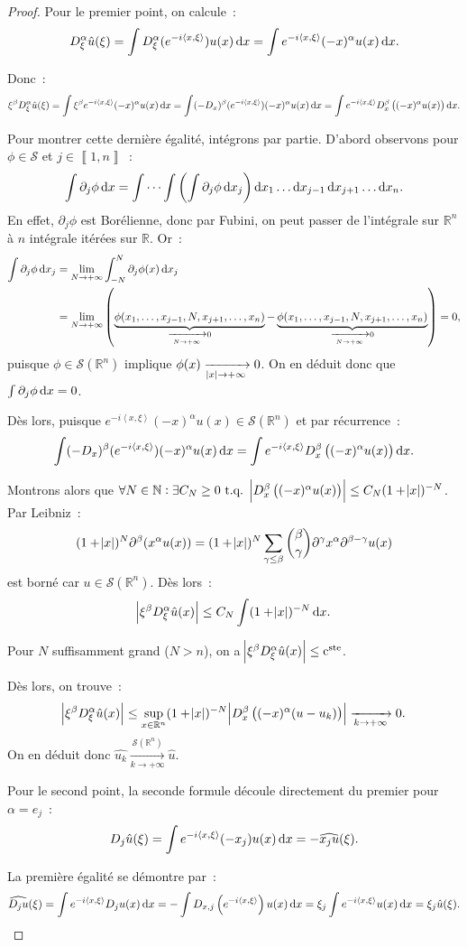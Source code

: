\documentclass{report}
\newcommand{\R}{{\mathbb R}}
\newcommand{\N}{{\mathbb N}}
\newcommand{\scpr}[2]{\left\langle#1, #2\right\rangle}
\newcommand{\tq}{\text{ t.q. }}
\newcommand{\pinfty}{{+\infty}}
\newcommand{\intint}[2]{{\left\llbracket#1, #2\right\rrbracket}}
\newcommand{\cste}{\text{c}^{\text{ste}}}
\newcommand{\dx}{\dif x}
\theoremstyle{definition}
\theoremstyle{remark}
\begin{document}
\begin{proof} Pour le premier point, on calcule~:
\[D^\alpha_\xi\hat u(\xi) = \int D^\alpha_\xi(e^{-i\scpr x\xi})u(x)\dif x = \int e^{-i\scpr x\xi}(-x)^\alpha u(x)\dif x.\]

Donc~:
\[\xi^\beta D^\alpha_\xi\hat u(\xi) = \int \xi^\beta e^{-i\scpr x\xi}(-x)^\alpha u(x)\dif x = \int (-D_x)^\beta(e^{-i\scpr x\xi})(-x)^\alpha u(x)\dif x
	= \int e^{-i\scpr x\xi} D^\beta_x\left((-x)^\alpha u(x)\right)\dif x.\]

Pour montrer cette dernière égalité, intégrons par partie. D'abord observons pour $\phi \in \mathcal S$ et $j \in \intint 1n$~:
\[\int \partial_j\phi\dx = \idotsint\left(\int \partial_j\phi\dx_j\right)\dx_1\ldots\dx_{j-1}\dx_{j+1}\ldots\dx_n.\]
En effet, $\partial_j\phi$ est Borélienne, donc par Fubini, on peut passer de l'intégrale sur $\R^n$ à $n$ intégrale itérées sur $\R$. Or~:
\begin{align*}
	\int \partial_j\phi\dx_j &= \lim_{N \to \pinfty}\int_{-N}^N\partial_j\phi(x)\dx_j \\
	&= \lim_{N \to \pinfty}\left(\underbrace {\phi(x_1, \ldots, x_{j-1}, N, x_{j+1}, \ldots, x_n)}_{\xrightarrow[N \to \pinfty]{} 0}
			- \underbrace {\phi(x_1, \ldots, x_{j-1}, N, x_{j+1}, \ldots, x_n)}_{\xrightarrow[N \to \pinfty]{} 0}\right) = 0,
\end{align*}
puisque $\phi \in \mathcal S(\R^n)$ implique $\phi(x) \xrightarrow[\abs x \to \pinfty]{} 0$. On en déduit donc que $\int\partial_j\phi\dx = 0$.

Dès lors, puisque $e^{-i\scpr x\xi}(-x)^\alpha u(x) \in \mathcal S(\R^n)$ et par récurrence~:
\[\int (-D_x)^\beta(e^{-i\scpr x\xi})(-x)^\alpha u(x)\dif x	= \int e^{-i\scpr x\xi} D^\beta_x\left((-x)^\alpha u(x)\right)\dif x.\]

Montrons alors que $\forall N \in \N : \exists C_N \geq 0 \tq \abs {D_x^\beta\left((-x)^\alpha u(x)\right)} \leq C_N(1 + \abs x)^{-N}$. Par Leibniz~:
\[(1 + \abs x)^N\partial^\beta (x^\alpha u(x)) = (1 + \abs x)^N\sum_{\gamma \leq \beta} \binom \beta\gamma\partial^\gamma x^\alpha\partial^{\beta-\gamma}u(x)\]
est borné car $u \in \mathcal S(\R^n)$. Dès lors~:
\[\abs {\xi^\beta D_\xi^\alpha \hat u(x)} \leq C_N\int(1 + \abs x)^{-N}\dx.\]

Pour $N$ suffisamment grand ($N > n$), on a $\abs {\xi^\beta D_\xi^\alpha \hat u(x)} \leq \cste$.

Dès lors, on trouve~:
\[\abs {\xi^\beta D_\xi^\alpha\hat u(x)} \leq \sup_{x \in \R^n}(1 + \abs x)^{-N}\abs {D_x^\beta\left((-x)^\alpha(u - u_k)\right)} \xrightarrow[k \to \pinfty]{} 0.\]
On en déduit donc $\hat {u_k} \xrightarrow[k \to \pinfty]{\mathcal S(\R^n)} \hat u$.

Pour le second point, la seconde formule découle directement du premier pour $\alpha = e_j$~:
\[D_j\hat u(\xi) = \int e^{-i\scpr x\xi}(-x_j)u(x)\dx = -\widehat {x_ju}(\xi).\]

La première égalité se démontre par~:
\[\widehat {D_ju}(\xi) = \int e^{-i\scpr x\xi} D_ju(x)\dx = -\int D_{x,j}\left(e^{-i\scpr x\xi}\right)u(x)\dx = \xi_j\int e^{-i\scpr x\xi}u(x)\dx = \xi_j\hat u(\xi).\]
\end{proof}
\end{document}
